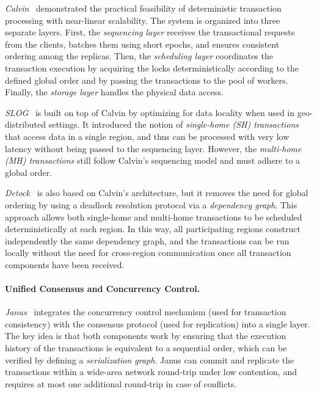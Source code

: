 \textit{Calvin}~\cite{thomson2012calvin} demonstrated the practical feasibility of deterministic transaction processing with near-linear scalability. The system is organized into three separate layers. First, the \textit{sequencing layer} receives the transactional requests from the clients, batches them using short epochs, and ensures consistent ordering among the replicas. Then, the \textit{scheduling layer} coordinates the transaction execution by acquiring the locks deterministically according to the defined global order and by passing the transactions to the pool of workers. Finally, the \textit{storage layer} handles the physical data access.

\textit{SLOG}~\cite{ren2019slog} is built on top of Calvin by optimizing for data locality when used in geo-distributed settings. It introduced the notion of \textit{single-home (SH) transactions} that access data in a single region, and thus can be processed with very low latency without being passed to the sequencing layer. However, the \textit{multi-home (MH) transactions} still follow Calvin's sequencing model and must adhere to a global order.

\textit{Detock}~\cite{nguyen2023detock} is also based on Calvin's architecture, but it removes the need for global ordering by using a deadlock resolution protocol via a \textit{dependency graph}. This approach allows both single-home and multi-home transactions to be scheduled deterministically at each region. In this way, all participating regions construct independently the same dependency graph, and the transactions can be run locally without the need for cross-region communication once all transaction components have been received.

\paragraph{Unified Consensus and Concurrency Control.}
\textit{Janus}~\cite{mu2016consolidating} integrates the concurrency control mechanism (used for transaction consistency) with the consensus protocol (used for replication) into a single layer. The key idea is that both components work by ensuring that the execution history of the transactions is equivalent to a sequential order, which can be verified by defining a \textit{serialization graph}. Janus can commit and replicate the transactions within a wide-area network round-trip under low contention, and requires at most one additional round-trip in case of conflicts.

